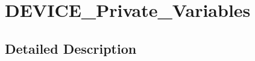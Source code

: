\hypertarget{group___d_e_v_i_c_e___private___variables}{}\section{D\+E\+V\+I\+C\+E\+\_\+\+Private\+\_\+\+Variables}
\label{group___d_e_v_i_c_e___private___variables}


\subsection{Detailed Description}
